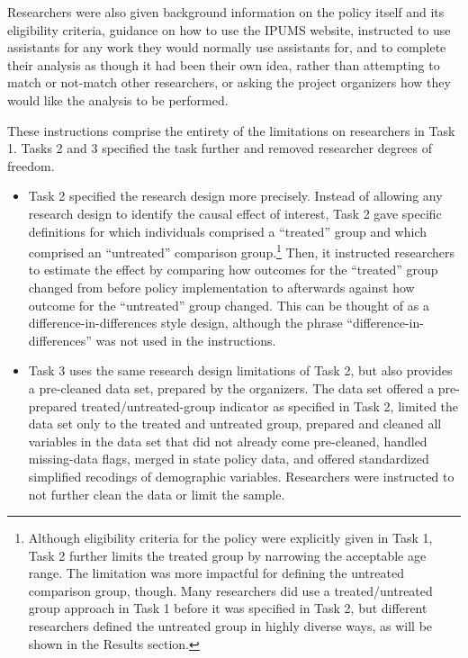 \documentclass[
  letterpaper,
  DIV=11,
  numbers=noendperiod]{scrartcl}
\begin{document}
Researchers were also given background information on the policy itself
and its eligibility criteria, guidance on how to use the IPUMS website,
instructed to use assistants for any work they would normally use
assistants for, and to complete their analysis as though it had been
their own idea, rather than attempting to match or not-match other
researchers, or asking the project organizers how they would like the
analysis to be performed.

These instructions comprise the entirety of the limitations on
researchers in Task 1. Tasks 2 and 3 specified the task further and
removed researcher degrees of freedom.

\begin{itemize}
\item
  Task 2 specified the research design more precisely. Instead of
  allowing any research design to identify the causal effect of
  interest, Task 2 gave specific definitions for which individuals
  comprised a ``treated'' group and which comprised an ``untreated''
  comparison group.\footnote{Although eligibility criteria for the
    policy were explicitly given in Task 1, Task 2 further limits the
    treated group by narrowing the acceptable age range. The limitation
    was more impactful for defining the untreated comparison group,
    though. Many researchers did use a treated/untreated group approach
    in Task 1 before it was specified in Task 2, but different
    researchers defined the untreated group in highly diverse ways, as
    will be shown in the Results section.} Then, it instructed
  researchers to estimate the effect by comparing how outcomes for the
  ``treated'' group changed from before policy implementation to
  afterwards against how outcome for the ``untreated'' group changed.
  This can be thought of as a difference-in-differences style design,
  although the phrase ``difference-in-differences'' was not used in the
  instructions.
\item
  Task 3 uses the same research design limitations of Task 2, but also
  provides a pre-cleaned data set, prepared by the organizers. The data
  set offered a pre-prepared treated/untreated-group indicator as
  specified in Task 2, limited the data set only to the treated and
  untreated group, prepared and cleaned all variables in the data set
  that did not already come pre-cleaned, handled missing-data flags,
  merged in state policy data, and offered standardized simplified
  recodings of demographic variables. Researchers were instructed to not
  further clean the data or limit the sample.
\end{itemize}
\end{document}
